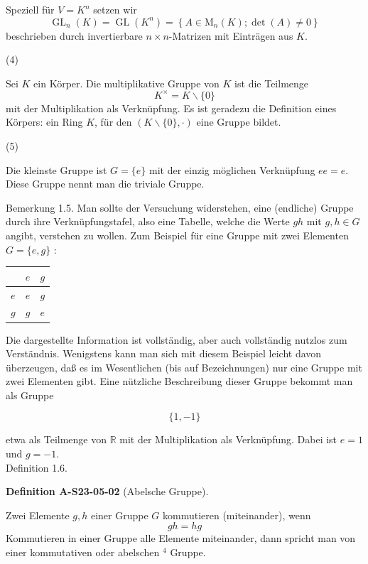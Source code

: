 \documentclass[10pt, letterpaper]{article}
\newcommand{\CustomHeading}[3]{%
  \par\medskip\noindent%
  \textbf{#1 #2} \textnormal{(#3)}.\enskip%
}
\newenvironment{DEF}[2]{\begin{unitbox}\CustomHeading{Definition}{#1}{#2}}{\end{unitbox}}
\begin{document}
Speziell für $V=K^{n}$ setzen wir
$$
\operatorname{GL}_{n}(K)=\operatorname{GL}\left(K^{n}\right)=\left\{A \in \mathrm{M}_{n}(K) ; \operatorname{det}(A) \neq 0\right\}
$$
beschrieben durch invertierbare $n \times n$-Matrizen mit Einträgen aus $K$.


(4) 

Sei $K$ ein Körper. Die multiplikative Gruppe von $K$ ist die Teilmenge
$$
K^{\times}=K \backslash\{0\}
$$
mit der Multiplikation als Verknüpfung. Es ist geradezu die Definition eines Körpers: ein Ring $K$, für den $(K \backslash\{0\}, \cdot)$ eine Gruppe bildet.

(5) 

Die kleinste Gruppe ist $G=\{e\}$ mit der einzig möglichen Verknüpfung $e e=e$. Diese Gruppe nennt man die triviale Gruppe.



Bemerkung 1.5. Man sollte der Versuchung widerstehen, eine (endliche) Gruppe durch ihre Verknüpfungstafel, also eine Tabelle, welche die Werte $g h$ mit $g, h \in G$ angibt, verstehen zu wollen. Zum Beispiel für eine Gruppe mit zwei Elementen $G=\{e, g\}$ :

\begin{center}
\begin{tabular}{c|cc}
 & $e$ & $g$ \\
\hline
$e$ & $e$ & $g$ \\
$g$ & $g$ & $e$ \\
\end{tabular}
\end{center}

Die dargestellte Information ist vollständig, aber auch vollständig nutzlos zum Verständnis. Wenigstens kann man sich mit diesem Beispiel leicht davon überzeugen, daß es im Wesentlichen (bis auf Bezeichnungen) nur eine Gruppe mit zwei Elementen gibt. Eine nützliche Beschreibung dieser Gruppe bekommt man als Gruppe

$$
\{1,-1\}
$$

etwa als Teilmenge von $\mathbb{R}$ mit der Multiplikation als Verknüpfung. Dabei ist $e=1$ und $g=-1$.\\



Definition 1.6. 


\begin{DEF}{A-S23-05-02}{Abelsche Gruppe}
Zwei Elemente $g, h$ einer Gruppe $G$ kommutieren (miteinander), wenn
$$
g h=h g
$$
Kommutieren in einer Gruppe alle Elemente miteinander, dann spricht man von einer kommutativen oder abelschen ${ }^{4}$ Gruppe.
\end{DEF}
\end{document}
